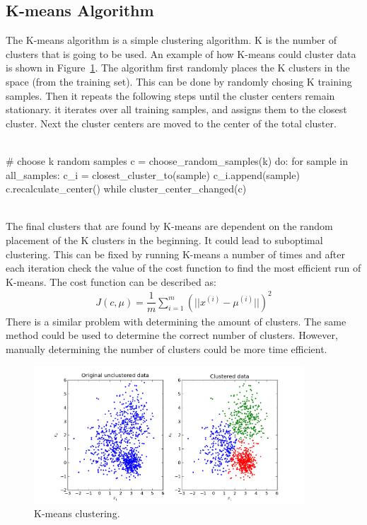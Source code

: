 \subsection{K-means Algorithm}
The K-means algorithm is a simple clustering algorithm. K is the number of clusters that is going to be used. An example of how K-means could cluster data is shown in Figure~\ref{fig:kmeansExample}. The algorithm first randomly places the K clusters in the space (from the training set). This can be done by randomly chosing K training samples. Then it repeats the following steps until the cluster centers remain stationary. it iterates over all training samples, and assigns them to the closest cluster. Next the cluster centers are moved to the center of the total cluster. \cite{kmeans2} \\
\\
\begin{python}
# choose k random samples
c = choose_random_samples(k)
do:
    for sample in all_samples:
        c_i = closest_cluster_to(sample)
        c_i.append(sample)
    c.recalculate_center()
while cluster_center_changed(c)
\end{python}~\\
The final clusters that are found by K-means are dependent on the random placement of the K clusters in the beginning. It could lead to suboptimal clustering. This can be fixed by running K-means a number of times and after each iteration check the value of the cost function to find the most efficient run of K-means. 
The cost function can be described as: \cite{kmeans}
\begin{align}
J(c, \mu) = \dfrac{1}{m} \sum\limits_{i=1}^m(|| x^{(i)} - \mu^{(i)}||)^2
\end{align}
There is a similar problem with determining the amount of clusters. The same method could be used to determine the correct number of clusters. However, manually determining the number of clusters could be more time efficient. \cite{kmeans2}

\begin{figure}[H]
\centering
\includegraphics[width=0.9\textwidth]{Figures/kmeansExample}
\decoRule
\caption[K-means clustering]{K-means clustering. \cite{kmeansExample}}
\label{fig:kmeansExample}
\end{figure}

